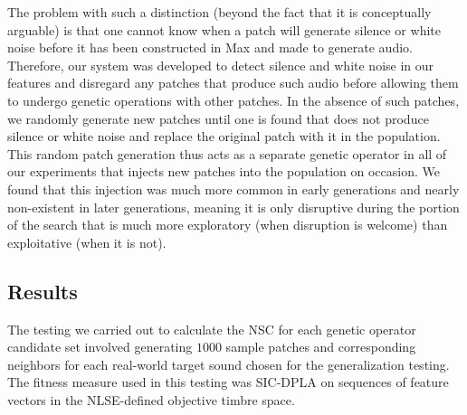 \documentclass[12pt]{report} 	%
\numberwithin{figure}{chapter}
\numberwithin{table}{chapter}
\numberwithin{equation}{chapter}
\begin{document}
\begin{flushleft}
The problem with such a distinction (beyond the fact that it is conceptually arguable) is that one cannot know when a patch will generate silence or white noise before it has been constructed in Max and made to generate audio. Therefore, our system was developed to detect silence and white noise in our features and disregard any patches that produce such audio before allowing them to undergo genetic operations with other patches. In the absence of such patches, we randomly generate new patches until one is found that does not produce silence or white noise and replace the original patch with it in the population. This random patch generation thus acts as a separate genetic operator in all of our experiments that injects new patches into the population on occasion. We found that this injection was much more common in early generations and nearly non-existent in later generations, meaning it is only disruptive during the portion of the search that is much more exploratory (when disruption is welcome) than exploitative (when it is not).

\subsection{Results}
The testing we carried out to calculate the NSC for each genetic operator candidate set involved generating $1000$ sample patches and corresponding neighbors for each real-world target sound chosen for the generalization testing. The fitness measure used in this testing was SIC-DPLA on sequences of feature vectors in the NLSE-defined objective timbre space.


\end{flushleft}
\end{document}
